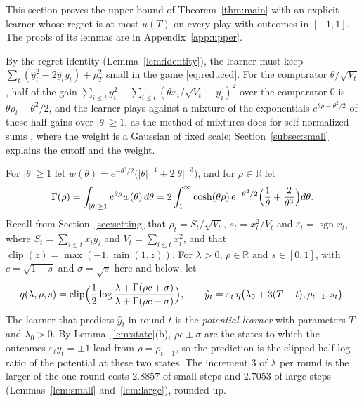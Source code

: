 \documentclass[12pt]{amsart}
\theoremstyle{definition}
\numberwithin{equation}{section}
\newcommand{\R}{\mathbb{R}}
\newcommand{\clip}{\operatorname{clip}}
\newcommand{\sgn}{\operatorname{sgn}}
\newcommand{\yh}{\hat y}
\begin{document}
This section proves the upper bound of Theorem~\ref{thm:main} with an explicit learner whose regret is at most $u(T)$ on every play with outcomes in $[-1,1]$. The proofs of its lemmas are in Appendix~\ref{app:upper}.

By the regret identity (Lemma~\ref{lem:identity}), the learner must keep $\sum_t(\yh_t^2-2\yh_ty_t)+\rho_T^2$ small in the game \eqref{eq:reduced}. For the comparator $\theta/\sqrt{V_t}$, half of the gain $\sum_{i\le t}y_i^2-\sum_{i\le t}(\theta x_i/\sqrt{V_t}-y_i)^2$ over the comparator $0$ is $\theta\rho_t-\theta^2/2$, and the learner plays against a mixture of the exponentials $e^{\theta\rho-\theta^2/2}$ of these half gains over $|\theta|\ge1$, as the method of mixtures does for self-normalized sums \citep[Theorem~2.1]{dlPKL}, where the weight is a Gaussian of fixed scale; Section~\ref{subsec:small} explains the cutoff and the weight.

For $|\theta|\ge1$ let $w(\theta)=e^{-\theta^2/2}\bigl(|\theta|^{-1}+2|\theta|^{-3}\bigr)$, and for $\rho\in\R$ let
\begin{equation}\label{eq:Gamma}
\Gamma(\rho)=\int_{|\theta|\ge1}e^{\theta\rho}w(\theta)\,d\theta=2\int_1^\infty\cosh(\theta\rho)\,e^{-\theta^2/2}\Bigl(\frac1\theta+\frac2{\theta^3}\Bigr)d\theta .
\end{equation}
Recall from Section~\ref{sec:setting} that $\rho_t=S_t/\sqrt{V_t}$, $s_t=x_t^2/V_t$ and $\varepsilon_t=\sgn x_t$, where $S_t=\sum_{i\le t}x_iy_i$ and $V_t=\sum_{i\le t}x_i^2$, and that $\clip(z)=\max(-1,\min(1,z))$. For $\lambda>0$, $\rho\in\R$ and $s\in[0,1]$, with $c=\sqrt{1-s}$ and $\sigma=\sqrt s$ here and below, let
\begin{equation}\label{eq:learner}
\eta(\lambda,\rho,s)=\clip\Bigl(\frac12\log\frac{\lambda+\Gamma(\rho c+\sigma)}{\lambda+\Gamma(\rho c-\sigma)}\Bigr),\qquad\yh_t=\varepsilon_t\,\eta\bigl(\lambda_0+3(T-t),\rho_{t-1},s_t\bigr).
\end{equation}
The learner that predicts $\yh_t$ in round $t$ is the \emph{potential learner} with parameters $T$ and $\lambda_0>0$. By Lemma~\ref{lem:state}(b), $\rho c\pm\sigma$ are the states to which the outcomes $\varepsilon_ty_t=\pm1$ lead from $\rho=\rho_{t-1}$, so the prediction is the clipped half log-ratio of the potential at these two states. The increment $3$ of $\lambda$ per round is the larger of the one-round costs $2.8857$ of small steps and $2.7053$ of large steps (Lemmas~\ref{lem:small} and~\ref{lem:large}), rounded up.
\end{document}
